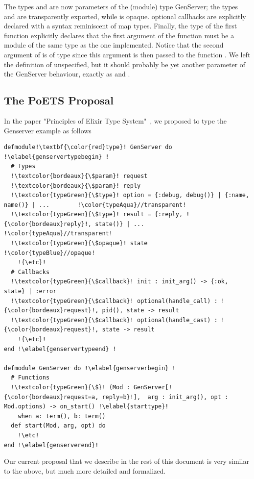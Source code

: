 \documentclass[a4paper,10pt]{article}
\begin{document}
The types  and  are now parameters of the (module) type GenServer; the types  and  are transparently exported, while  is opaque. optional callbacks are explicitly declared with a syntax reminiscent of map types. Finally, the type of the  first  function explicitly declares that the first argument of the  function must be a module of the same type as the one implemented. Notice that the second argument of  is of type  since this argument is then passed to the function . We left the definition of  unspecified, but it should probably be yet another parameter of the GenServer behaviour, exactly as   and .  



\subsection{The PoETS Proposal}
In the paper "Principles of Elixir Type System"~\cite{CDV24}, we proposed to type the Genserver example as follows

\begin{verbatim}
defmodule!\textbf{\color{red}type}! GenServer do  !\elabel{genservertypebegin} !                     
  # Types
  !\textcolor{bordeaux}{\$param}! request
  !\textcolor{bordeaux}{\$param}! reply
  !\textcolor{typeGreen}{\$type}! option = {:debug, debug()} | {:name, name()} | ...        !\color{typeAqua}//transparent!
  !\textcolor{typeGreen}{\$type}! result = {:reply, !{\color{bordeaux}reply}!, state()} | ...                   !\color{typeAqua}//transparent!
  !\textcolor{typeGreen}{\$opaque}! state                                                   !\color{typeBlue}//opaque!
    !{\etc}!
  # Callbacks
  !\textcolor{typeGreen}{\$callback}! init : init_arg() -> {:ok, state} | :error      
  !\textcolor{typeGreen}{\$callback}! optional(handle_call) : !{\color{bordeaux}request}!, pid(), state -> result
  !\textcolor{typeGreen}{\$callback}! optional(handle_cast) : !{\color{bordeaux}request}!, state -> result        
    !{\etc}!
end !\elabel{genservertypeend} !

defmodule GenServer do !\elabel{genserverbegin} !                     
  # Functions
  !\textcolor{typeGreen}{\$}! (Mod : GenServer[!{\color{bordeaux}request=a, reply=b}!],  arg : init_arg(), opt : Mod.options) -> on_start() !\elabel{starttype}!
    when a: term(), b: term()
  def start(Mod, arg, opt) do
    !\etc!
end !\elabel{genserverend}!
\end{verbatim}
Our current proposal that we describe in the rest of this document is very similar to the above, but much more detailed and formalized.
\end{document}
